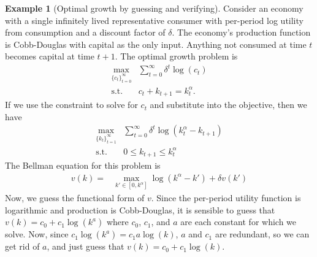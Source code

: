 \documentclass[12pt,reqno]{amsart}
\theoremstyle{definition}
\newtheorem{example}{Example}[section]
\begin{document}
\begin{example}[Optimal growth by guessing and verifying]
  Consider an economy with a single infinitely lived representative
  consumer with per-period log utility from consumption and a discount
  factor of $\delta$. The economy's production function is
  Cobb-Douglas with capital as the only input. Anything not consumed
  at time $t$ becomes capital at time $t+1$. The optimal growth
  problem is
  \begin{align*}
    \max_{\{c_t\}_{t=0}^\infty} & \sum_{t=0}^\infty \delta^t
    \log(c_t) \\
    \text{s.t. } & c_t + k_{t+1} = k_t^\alpha.
  \end{align*}
  If we use the constraint to solve for $c_t$ and substitute into the
  objective, then we have
  \begin{align*}
    \max_{\{k_t\}_{t=1}^\infty} & \sum_{t=0}^\infty \delta^t
    \log(k_t^\alpha - k_{t+1}) \\
    \text{s.t.} & 0 \leq k_{t+1} \leq k_t^\alpha 
  \end{align*}
 The Bellman equation for this problem is
 \begin{align*}
   v(k) = & \max_{k' \in [0,k^\alpha]} \log(k^\alpha - k') + \delta
   v(k')
 \end{align*}
 Now, we guess the functional form of $v$. Since the per-period
 utility function is logarithmic and production is Cobb-Douglas, it is
 sensible to guess that $v(k) = c_0 + c_1 \log(k^a)$ where $c_0$,
 $c_1$, and $a$ are each constant for which we solve. Now, since $c_1
 \log(k^a) = c_1 a \log(k)$, $a$ and $c_1$ are redundant, so we can
 get rid of $a$, and just guess that $v(k) = c_0 + c_1 \log(k)$. 
 

\end{example}
\end{document}
